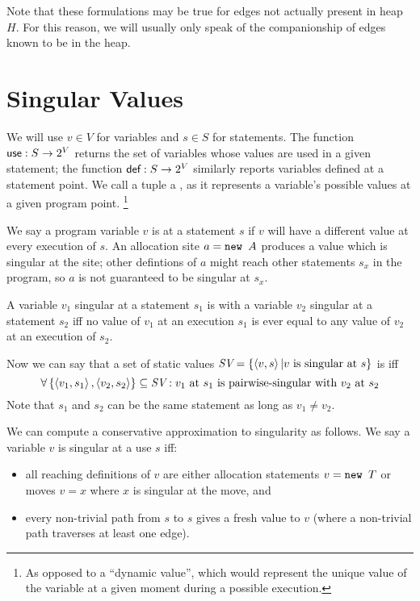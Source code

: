 \documentclass[11pt,notitlepage]{article}
\newcommand{\bigvar}[1]{\ensuremath{\text{\it #1}}}
\newcommand{\func}[1]{\ensuremath{\text{\sffamily #1}}}
\begin{document}
Note that these formulations may be true for edges not actually
present in heap $H$.  For this reason, we will usually only speak of the
companionship of edges known to be in the heap.

\section{Singular Values}
We will use $v\in V$ for variables and $s\in S$ for statements.  The
function $\func{use}:S\to 2^V$ returns the set of variables whose
values are used in a given statement; the function $\func{def}:S\to
2^V$ similarly reports variables defined at a statement point.
We call a tuple  a , as it represents
a variable's possible values at a given program point.%
\footnote{As opposed to a ``dynamic value'', which would represent the
  unique value of the variable at a given moment during a possible execution.}

We say a program variable $v$ is  at a statement $s$
if $v$ will have a different value at every execution of $s$.  An
allocation site $a = \text{\tt new }A$ produces a value which is singular
at the site; other defintions of $a$ might reach other statements
$s_x$ in the program, so $a$ is not guaranteed to be singular at $s_x$.

A variable $v_1$ singular at a statement $s_1$ is
 with a variable $v_2$ singular at a statement
$s_2$ iff no value of $v_1$ at an execution $s_1$ is ever equal to any
value of $v_2$ at an execution of $s_2$.

Now we can say that a set of static values
$\bigvar{SV}=\left\{ \tuple{v,s} | v \text{ is singular at } s \right\}$
is
 iff
\begin{displaymath}
\forall \left\{ \tuple{v_1,s_1}, \tuple{v_2,s_2} \right\} \subseteq
        \bigvar{SV} :
v_1 \text{ at } s_1 \text{ is pairwise-singular with } v_2 \text{ at } s_2
\end{displaymath}
Note that $s_1$ and $s_2$ can be the same statement as long as $v_1\neq v_2$.

We can compute a conservative approximation to singularity as follows.
We say a variable $v$ is singular at a use $s$ iff:
\begin{itemize}
\item all reaching definitions of $v$ are either allocation statements 
$v = \text{\tt new }T$ or moves $v = x$ where $x$ is singular at
the move, and
\item every non-trivial path from $s$ to $s$ gives a fresh value to $v$
  (where a non-trivial path traverses at least one edge).
\end{itemize}
\end{document}
